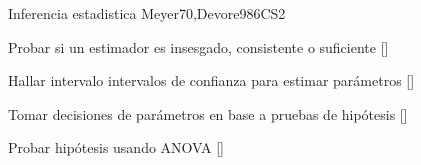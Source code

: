 \begin{syllabus}
\begin{unit}{}{Inferencia estadistica }{Meyer70,Devore98}{6}{CS2}
   \begin{learningoutcomes}
      \item Probar si un estimador es insesgado, consistente o suficiente [\Usage]
      \item Hallar intervalo intervalos de confianza para estimar parámetros [\Usage]
      \item Tomar decisiones de parámetros en base a pruebas de hipótesis [\Usage]
      \item Probar hipótesis usando ANOVA [\Usage]
   \end{learningoutcomes}
\end{unit}







\begin{coursebibliography}
\end{coursebibliography}

\end{syllabus}
